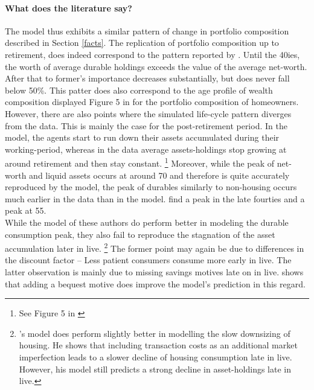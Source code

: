 \documentclass[a4paper,12pt,legno]{article}
\begin{document}
\paragraph{What does the literature say?} The model thus exhibits a similar pattern of change in portfolio composition described in Section \ref{facts}. The replication of portfolio composition up to retirement, does indeed correspond to the pattern reported by \cite{FV&K2011}. Until the 40ies, the worth of average durable holdings exceeds the value of the average net-worth. After that to former's importance decreases substantially, but does never fall below 50\%. This patter does also correspond to the age profile of wealth composition displayed Figure 5 in \cite{yang2009} for the portfolio composition of homeowners. \\ However, there are also points where the simulated life-cycle pattern diverges from the data. This is mainly the case for the post-retirement period. In the model, the agents start to run down their assets accumulated during their working-period, whereas in the data average assets-holdings stop growing at around retirement and then stay constant. \footnote{See Figure 5 in \cite{yang2009}} Moreover, while the peak of net-worth and liquid assets occurs at around 70 and therefore is quite accurately reproduced by the model, the peak of durables similarly to non-housing occurs much earlier in the data than in the model. \citep{FV&K2011} find a peak in the late fourties and \citep{yang2009} a peak at 55. \\
While the model of these authors do perform better in modeling the durable consumption peak, they also fail to reproduce the stagnation of the asset accumulation later in live. \footnote{\cite{yang2009}'s model does perform slightly better in modelling the slow downsizing of housing. He shows that including transaction costs as an additional market imperfection leads to a slower decline of housing consumption late in live. However, his model still predicts a strong decline in asset-holdings late in live.} The former point may again be due to differences in the discount factor \--- Less patient consumers consume more early in live. The latter observation is mainly due to missing savings motives late on in live. \cite{de2004wealth} shows that adding a bequest motive does improve the model's prediction in this regard. 
\end{document}
